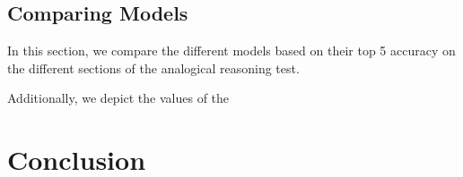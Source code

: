 \documentclass[11pt]{article}
\begin{document}
\clearpage


\subsection{Comparing Models} 
In this section, we compare the different models based on their top 5 accuracy on the different sections of the analogical reasoning test. 

Additionally, we depict the values of the 


\section{Conclusion}
\nocite{*}


\end{document}
